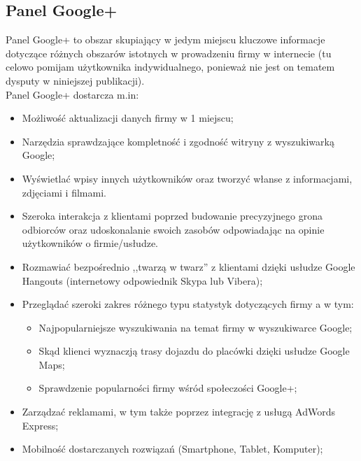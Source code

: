 
\subsection{Panel Google+}
Panel Google+ to obszar skupiający w jedym miejscu kluczowe informacje dotyczące różnych obszarów istotnych w prowadzeniu firmy w internecie (tu celowo pomijam użytkownika indywidualnego, ponieważ nie jest on tematem dysputy w niniejszej publikacji).\\

Panel Google+ dostarcza m.in:

\begin{itemize}
\item Możliwość aktualizacji danych firmy w 1 miejscu;

\item Narzędzia sprawdzające kompletność i zgodność witryny z wyszukiwarką Google;

\item Wyświetlać wpisy innych użytkowników oraz tworzyć włanse z informacjami, zdjęciami i filmami.

\item Szeroka interakcja z klientami poprzed budowanie precyzyjnego grona odbiorców oraz udoskonalanie swoich zasobów odpowiadając na opinie użytkowników o firmie/usłudze.

\item Rozmawiać bezpośrednio ,,twarzą w twarz'' z klientami dzięki usłudze Google Hangouts (internetowy odpowiednik Skypa lub Vibera);

\item Przeglądać szeroki zakres różnego typu statystyk dotyczących firmy a w tym:
    \begin{itemize}
    \item Najpopularniejsze wyszukiwania na temat firmy w wyszukiwarce Google;
    \item Skąd klienci wyznaczją trasy dojazdu do placówki dzięki usłudze Google Maps;
    \item Sprawdzenie popularności firmy wśród społeczości Google+;
    \end{itemize}

\item Zarządzać reklamami, w tym także poprzez integrację z usługą AdWords Express;

\item Mobilność dostarczanych rozwiązań (Smartphone, Tablet, Komputer);
\end{itemize}

